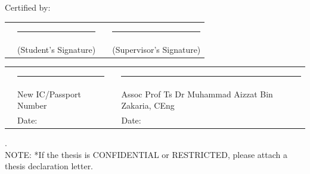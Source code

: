 \begin{onehalfspacing}
{\begin{minipage}{15cm}
\begin{flushleft}
Certified by:
\vspace{0.5cm}
\end{flushleft}

\begin{tabular}[h]{p{1cm}p{5cm}p{1cm}p{5cm}}
& \rule{5cm}{0.4pt} & & \rule{5cm}{0.4pt}\\
& (Student's Signature) & & (Supervisor's Signature)\\
\end{tabular}

\vspace{0.5cm}

\begin{tabular}[h]{p{1cm}p{5cm}p{1cm}p{5cm}}
& \rule{5cm}{0.4pt} & & \rule{5cm}{0.4pt}\\
& New IC/Passport Number & & Assoc Prof Ts Dr Muhammad Aizzat Bin Zakaria, CEng\\
& Date: & & Date:
\end{tabular}

\end{minipage}}
{.}\\
{NOTE: *If the thesis is CONFIDENTIAL or RESTRICTED, please attach a thesis declaration letter.}
\end{onehalfspacing}